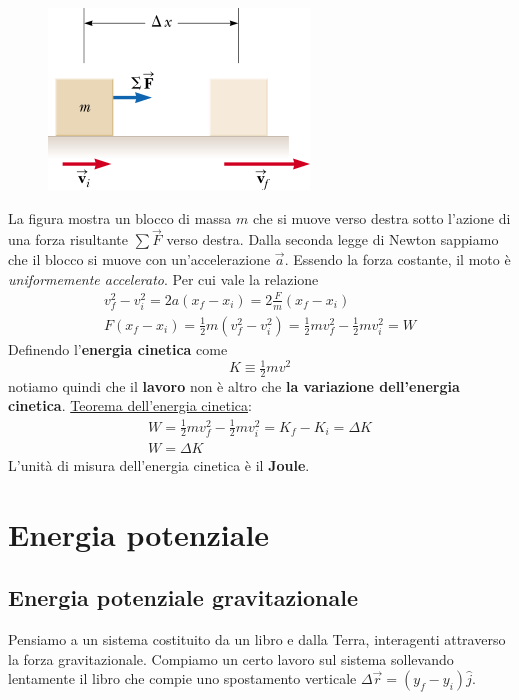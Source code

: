\documentclass[a4paper,11pt,oneside]{book}
\begin{document}
\begin{figure}[h]
    \centering
    \includegraphics[scale=0.4]{energia_cinetica_schema.png}
\end{figure}
La figura mostra un blocco di massa $m$ che si muove verso destra sotto l’azione di una forza risultante $\sum \vec{F}$ verso destra. Dalla seconda legge di Newton sappiamo che il blocco si muove con un’accelerazione $\vec{a}$.
Essendo la forza costante, il moto è \emph{uniformemente accelerato}. Per cui vale la relazione
\begin{gather*}
    v_f^2-v_i^2 = 2a(x_f-x_i) = 2\tfrac{F}{m}(x_f-x_i) \\
    F(x_f-x_i) = \tfrac{1}{2}m(v_f^2-v_i^2) = \tfrac{1}{2}mv_f^2 - \tfrac{1}{2}mv_i^2 = W
\end{gather*}
Definendo l'\textbf{energia cinetica} come
\begin{equation*}
    K \equiv \tfrac{1}{2}mv^2
\end{equation*}
notiamo quindi che il \textbf{lavoro} non è altro che \textbf{la variazione dell'energia cinetica}.
\underline{Teorema dell'energia cinetica}:
\begin{gather*}
    W = \tfrac{1}{2}mv_f^2 - \tfrac{1}{2}mv_i^2 = K_f - K_i = \Delta K \\
    W = \Delta K
\end{gather*}
L'unità di misura dell'energia cinetica è il \textbf{Joule}.

\section{Energia potenziale}
\subsection{Energia potenziale gravitazionale}
Pensiamo a un sistema costituito da un libro e dalla Terra, interagenti attraverso la forza gravitazionale.
Compiamo un certo lavoro sul sistema sollevando lentamente il libro che compie uno spostamento verticale $\Delta \vec{r} = (y_f - y_i)\hat{j}$.
\end{document}
